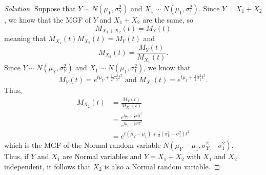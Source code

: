 \documentclass[11pt]{article}
\newenvironment{solution}
  {\renewcommand\qedsymbol{$\blacksquare$}\begin{proof}[Solution]}
  {\end{proof}}
\begin{document}
\begin{enumerate}
\begin{enumerate}[a)]
      \begin{solution}
      Suppose that $Y \sim N(\mu_Y, \sigma_Y^2)$ and $X_1 \sim N(\mu_1, \sigma_1^2)$. Since $Y = X_1 + X_2$, we know that the MGF of $Y$ and $X_1 + X_2$ are the same, so
      \[
        M_{X_1 + X_2}(t) = M_Y(t)
      \]
      meaning that $M_{X_1}(t) M_{X_2}(t) = M_Y(t)$ and 
      \[
        M_{X_2}(t) = \frac{M_Y(t)}{M_{X_1}(t)}.
      \]
      Since $Y \sim N(\mu_Y, \sigma_Y^2)$ and $X_1 \sim N(\mu_1, \sigma_1^2)$, we know that 
      \[
        M_Y(t) = e^{t \mu_Y + \frac{1}{2}\sigma_Y^2 t^2} \text{ and } M_{X_1}(t) = e^{t \mu_1 + \frac{1}{2}\sigma_1^2 t^2}.
      \]
      Thus,
      \begin{align*}
        M_{X_2}(t) &= \frac{M_Y(t)}{M_{X_1}(t)} \\
        &= \frac{e^{t \mu_Y + \frac{1}{2}\sigma_Y^2 t^2}}{e^{t \mu_1 + \frac{1}{2}\sigma_1^2 t^2}} \\
        &= e^{t(\mu_Y - \mu_1) + \frac{1}{2}(\sigma_Y^2 - \sigma_1^2)t^2}
      \end{align*}
      which is the MGF of the Normal random variable $N(\mu_Y - \mu_1, \sigma_Y^2 - \sigma_1^2)$. \\

      Thus, if $Y$ and $X_1$ are Normal variables and $Y = X_1 + X_2$ with $X_1$ and $X_2$ independent, it follows that $X_2$ is also a Normal random variable.
      \end{solution}
    \end{enumerate}
    
\end{enumerate}
\end{document}
